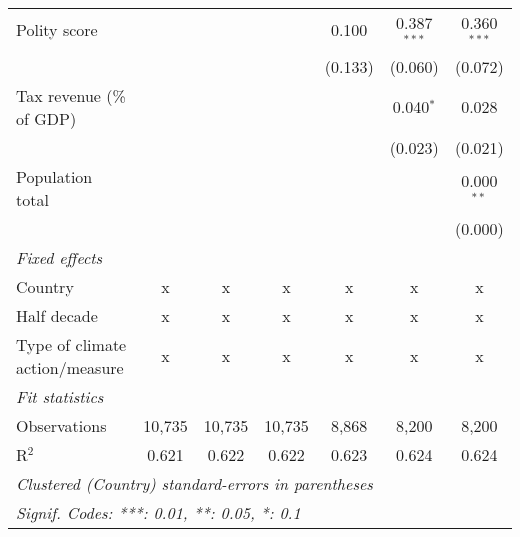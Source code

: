 \begin{tabular}{lcccccc}
   Polity score                                               &         &               &                & 0.100          & 0.387$^{***}$  & 0.360$^{***}$\\   
                                                              &         &               &                & (0.133)        & (0.060)        & (0.072)\\   
   Tax revenue (\% of GDP)                                    &         &               &                &                & 0.040$^{*}$    & 0.028\\   
                                                              &         &               &                &                & (0.023)        & (0.021)\\   
   Population total                                           &         &               &                &                &                & 0.000$^{**}$\\   
                                                              &         &               &                &                &                & (0.000)\\   
   \emph{Fixed effects}\\
   Country                                                    & x       & x             & x              & x              & x              & x\\  
   Half decade                                                & x       & x             & x              & x              & x              & x\\  
   Type of climate action/measure                             & x       & x             & x              & x              & x              & x\\  
   \midrule \emph{Fit statistics}\\
   Observations                                               & 10,735  & 10,735        & 10,735         & 8,868          & 8,200          & 8,200\\  
   R$^2$                                                      & 0.621   & 0.622         & 0.622          & 0.623          & 0.624          & 0.624\\  
   \midrule
   \multicolumn{7}{l}{\emph{Clustered (Country) standard-errors in parentheses}}\\
   \multicolumn{7}{l}{\emph{Signif. Codes: ***: 0.01, **: 0.05, *: 0.1}}\\
\end{tabular}
\par\endgroup


